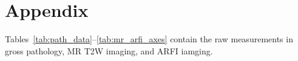 \section{Appendix}\label{sect:appendix}

Tables~\ref{tab:path_data}--\ref{tab:mr_arfi_axes} contain the raw measurements in gross pathology,
MR T2W imaging, and ARFI iamging.



\clearpage


\clearpage

